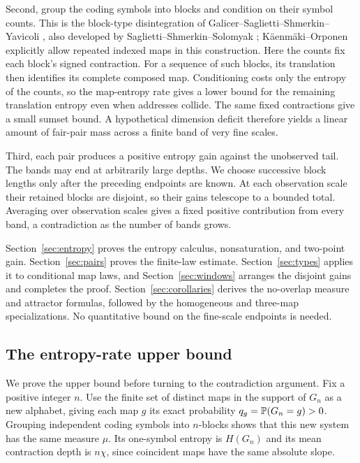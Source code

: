 Second, group the coding symbols into blocks and condition on their
symbol counts.  This is the block-type disintegration of
Galicer--Saglietti--Shmerkin--Yavicoli
\cite[Section~6.4 and Lemma~6.6]{GalicerSagliettiShmerkinYavicoli2016},
also developed by Saglietti--Shmerkin--Solomyak
\cite[Lemma~6.2]{SagliettiShmerkinSolomyak2018};
K\"aenm\"aki--Orponen \cite[Section~2.2]{KaenmakiOrponen2023}
explicitly allow repeated indexed maps in this construction.
Here the counts fix each block's signed contraction.
For a sequence of such blocks, its translation then identifies its
complete composed map.  Conditioning costs only the entropy of the
counts, so the map-entropy rate gives a lower bound for the remaining
translation entropy even when addresses collide.  The same fixed
contractions give a small sumset bound.  A hypothetical dimension
deficit therefore yields a linear amount of fair-pair mass across a
finite band of very fine scales.

Third, each pair produces a positive entropy gain against the
unobserved tail.  The bands may end at arbitrarily large depths.
We choose successive block lengths only after the preceding endpoints
are known.  At each observation scale their retained blocks are
disjoint, so their gains telescope to a bounded total.  Averaging over
observation scales gives a fixed positive contribution from every
band, a contradiction as the number of bands grows.

Section~\ref{sec:entropy} proves the entropy calculus, nonsaturation,
and two-point gain.  Section~\ref{sec:pairs} proves the finite-law
estimate.  Section~\ref{sec:types} applies it to conditional map laws,
and Section~\ref{sec:windows} arranges the disjoint gains and completes
the proof.  Section~\ref{sec:corollaries} derives the no-overlap measure
and attractor formulas, followed by the homogeneous and three-map
specializations.  No quantitative bound on the fine-scale endpoints is needed.

\subsection{The entropy-rate upper bound}\label{sec:upper}

We prove the upper bound before turning to the contradiction argument.
Fix a positive integer $n$.  Use the finite set of distinct maps in
the support of $G_n$ as a new alphabet, giving each map $g$ its exact
probability $q_g=\P(G_n=g)>0$.  Grouping independent coding symbols
into $n$-blocks shows that this new system has the same measure $\mu$.
Its one-symbol entropy is $H(G_n)$ and its mean contraction depth is
$n\chi$, since coincident maps have the same absolute slope.

